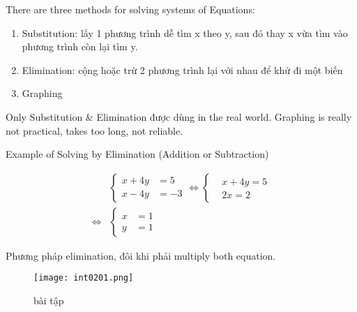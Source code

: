 There are three methods for solving systems of Equations:

\begin{enumerate}
  \item Substitution: lấy 1 phương trình dễ tìm x theo y, sau đó thay x vừa tìm vào phương trình còn lại tìm y.
  \item Elimination: cộng hoặc trừ 2 phương trình lại với nhau để khử đi một biến
  \item Graphing
\end{enumerate}

Only Substitution \& Elimination được dùng in the real world. Graphing is really not practical, takes too long, not reliable.


Example of Solving by Elimination (Addition or Subtraction)

\[
  \begin{aligned}
    &\left\{\begin{aligned} 
      x + 4y &= 5 \\ 
      x - 4y &= -3
    \end{aligned}\right. \iff 
    \left\{\begin{aligned}
      &x +4y = 5\\ 
      &2x = 2
    \end{aligned}\right.
    \\
    \iff &\left\{\begin{aligned} 
      x &= 1 \\ 
      y &= 1
    \end{aligned}\right.
  \end{aligned}
\]


Phương pháp elimination, đôi khi phải multiply both equation.

\begin{figure}[htb!]
  \centering
  \texttt{[image: int0201.png]}
  \caption{bài tập}
\end{figure}

